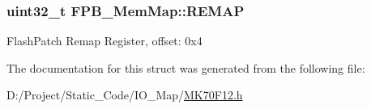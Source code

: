 \subsubsection[{R\+E\+M\+A\+P}]{\setlength{\rightskip}{0pt plus 5cm}uint32\+\_\+t F\+P\+B\+\_\+\+Mem\+Map\+::\+R\+E\+M\+A\+P}\label{struct_f_p_b___mem_map_acdaa312f2de037db4f203b9cfd303772}
Flash\+Patch Remap Register, offset\+: 0x4 

The documentation for this struct was generated from the following file\+:\begin{DoxyCompactItemize}
\item 
D\+:/\+Project/\+Static\+\_\+\+Code/\+I\+O\+\_\+\+Map/\hyperlink{_m_k70_f12_8h}{M\+K70\+F12.\+h}\end{DoxyCompactItemize}
